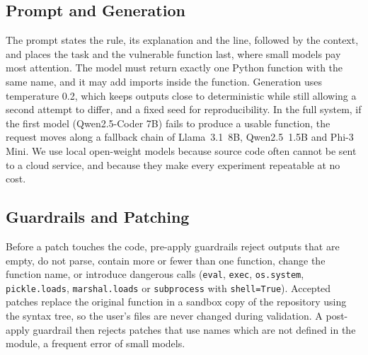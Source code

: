 \documentclass[12pt,onecolumn,draftclsnofoot]{IEEEtran}
\begin{document}
\subsection{Prompt and Generation}
The prompt states the rule, its explanation and the line, followed by the context, and places the task and the vulnerable function last, where small models pay most attention. The model must return exactly one Python function with the same name, and it may add imports inside the function. Generation uses temperature 0.2, which keeps outputs close to deterministic while still allowing a second attempt to differ, and a fixed seed for reproducibility. In the full system, if the first model (Qwen2.5-Coder 7B) fails to produce a usable function, the request moves along a fallback chain of Llama~3.1~8B, Qwen2.5~1.5B and Phi-3 Mini. We use local open-weight models because source code often cannot be sent to a cloud service, and because they make every experiment repeatable at no cost.

\subsection{Guardrails and Patching}
Before a patch touches the code, pre-apply guardrails reject outputs that are empty, do not parse, contain more or fewer than one function, change the function name, or introduce dangerous calls (\texttt{eval}, \texttt{exec}, \texttt{os.system}, \texttt{pickle.loads}, \texttt{marshal.loads} or \texttt{subprocess} with \texttt{shell=True}). Accepted patches replace the original function in a sandbox copy of the repository using the syntax tree, so the user's files are never changed during validation. A post-apply guardrail then rejects patches that use names which are not defined in the module, a frequent error of small models.
\end{document}
